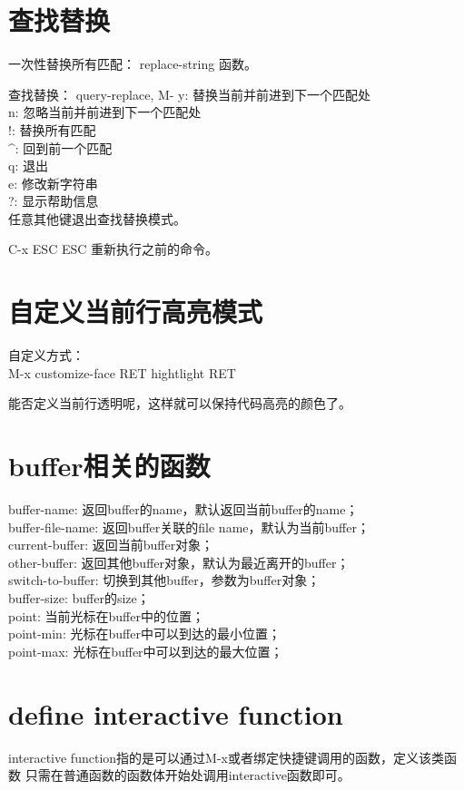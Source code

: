 \documentclass[a4paper,11pt]{article}
\begin{document}
  \section[查找替换]{查找替换}
  一次性替换所有匹配： replace-string 函数。

  查找替换： query-replace, M-%
  y: 替换当前并前进到下一个匹配处\\
  n: 忽略当前并前进到下一个匹配处\\
  !: 替换所有匹配\\
  \^{}: 回到前一个匹配\\
  q: 退出\\
  e: 修改新字符串\\
  ?: 显示帮助信息\\
  任意其他键退出查找替换模式。

  C-x ESC ESC 重新执行之前的命令。

  \section[自定义当前行高亮模式]{自定义当前行高亮模式}
  自定义方式：\\
  M-x customize-face RET hightlight RET

  能否定义当前行透明呢，这样就可以保持代码高亮的颜色了。


  \section[buffer相关的函数]{buffer相关的函数}
  buffer-name: 返回buffer的name，默认返回当前buffer的name；\\
  buffer-file-name: 返回buffer关联的file name，默认为当前buffer；\\
  current-buffer: 返回当前buffer对象；\\
  other-buffer: 返回其他buffer对象，默认为最近离开的buffer；\\
  switch-to-buffer: 切换到其他buffer，参数为buffer对象；\\
  buffer-size: buffer的size；\\
  point: 当前光标在buffer中的位置；\\
  point-min: 光标在buffer中可以到达的最小位置；\\
  point-max: 光标在buffer中可以到达的最大位置；\\
  

  \section[define interactive function]{define interactive function}
  interactive function指的是可以通过M-x或者绑定快捷键调用的函数，定义该类函数
  只需在普通函数的函数体开始处调用interactive函数即可。
\end{document}
